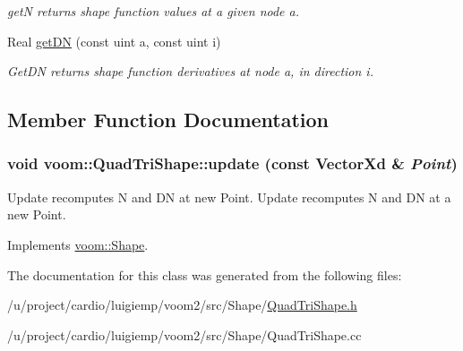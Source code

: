\begin{DoxyCompactItemize}
\begin{DoxyCompactList}\small\item\em getN returns shape function values at a given node a. \item\end{DoxyCompactList}\item 
\hypertarget{classvoom_1_1_quad_tri_shape_aa8b93b502aee6e577ae0cc769018abea}{
Real \hyperlink{classvoom_1_1_quad_tri_shape_aa8b93b502aee6e577ae0cc769018abea}{getDN} (const uint a, const uint i)}
\label{classvoom_1_1_quad_tri_shape_aa8b93b502aee6e577ae0cc769018abea}

\begin{DoxyCompactList}\small\item\em GetDN returns shape function derivatives at node a, in direction i. \item\end{DoxyCompactList}\end{DoxyCompactItemize}


\subsection{Member Function Documentation}
\hypertarget{classvoom_1_1_quad_tri_shape_a1e0317d601f43cced80377e60db19b49}{
\subsubsection[{update}]{\setlength{\rightskip}{0pt plus 5cm}void voom::QuadTriShape::update (const VectorXd \& {\em Point})}}
\label{classvoom_1_1_quad_tri_shape_a1e0317d601f43cced80377e60db19b49}


Update recomputes N and DN at new Point. Update recomputes N and DN at a new Point. 

Implements \hyperlink{classvoom_1_1_shape_a8ded544de12647543b056cec61be9f26}{voom::Shape}.

The documentation for this class was generated from the following files:\begin{DoxyCompactItemize}
\item 
/u/project/cardio/luigiemp/voom2/src/Shape/\hyperlink{_quad_tri_shape_8h}{QuadTriShape.h}\item 
/u/project/cardio/luigiemp/voom2/src/Shape/QuadTriShape.cc\end{DoxyCompactItemize}
